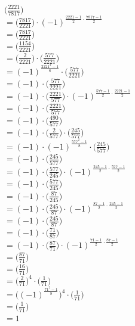$\Big( \frac{2221 }{ 7817}\Big)$\\
$=\Big( \frac{7817 }{ 2221}\Big) \cdot (-1)^{\frac{2221-1}{2} \cdot \frac{7817 - 1}{2}}$\\
$=\Big( \frac{7817 }{ 2221}\Big)$\\
$= \Big( \frac{1154 }{ 2221}\Big)$\\
$=\Big( \frac{2}{ 2221}\Big) \cdot \Big( \frac{577 }{ 2221}\Big)$\\
$=(-1)^{\frac{2221^2-1}{8}} \cdot \Big( \frac{577 }{ 2221}\Big)$\\
$=(-1) \cdot \Big( \frac{577 }{ 2221}\Big)$\\
$=(-1) \cdot \Big( \frac{2221 }{ 577}\Big) \cdot (-1)^{\frac{577-1}{2} \cdot \frac{2221 - 1}{2}}$\\
$=(-1) \cdot \Big( \frac{2221 }{ 577}\Big)$\\
$=(-1) \cdot  \Big( \frac{490 }{ 577}\Big)$\\
$=(-1) \cdot \Big( \frac{2}{ 577}\Big) \cdot \Big( \frac{245 }{ 577}\Big)$\\
$=(-1) \cdot (-1)^{\frac{577^2-1}{8}} \cdot \Big( \frac{245 }{ 577}\Big)$\\
$=(-1) \cdot \Big( \frac{245 }{ 577}\Big)$\\
$=(-1) \cdot \Big( \frac{577 }{ 245}\Big) \cdot (-1)^{\frac{245-1}{2} \cdot \frac{577 - 1}{2}}$\\
$=(-1) \cdot \Big( \frac{577 }{ 245}\Big)$\\
$=(-1) \cdot  \Big( \frac{87 }{ 245}\Big)$\\
$=(-1) \cdot \Big( \frac{245 }{ 87}\Big) \cdot (-1)^{\frac{87-1}{2} \cdot \frac{245 - 1}{2}}$\\
$=(-1) \cdot \Big( \frac{245 }{ 87}\Big)$\\
$=(-1) \cdot  \Big( \frac{71 }{ 87}\Big)$\\
$=(-1) \cdot \Big( \frac{87 }{ 71}\Big) \cdot (-1)^{\frac{71-1}{2} \cdot \frac{87 - 1}{2}}$\\
$=\Big( \frac{87 }{ 71}\Big)$\\
$= \Big( \frac{16 }{ 71}\Big)$\\
$=\Big( \frac{2}{ 71}\Big)^{4} \cdot \Big( \frac{1 }{ 71}\Big)$\\
$=\Big( (-1)^{\frac{71^2-1}{8}} \Big)^{4} \cdot \Big( \frac{1 }{ 71}\Big)$\\
$=\Big( \frac{1 }{ 71}\Big)$\\
$=1$\\
